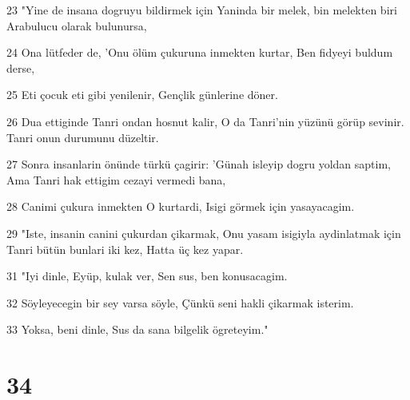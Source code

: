 \par 23 "Yine de insana dogruyu bildirmek için Yaninda bir melek, bin melekten biri Arabulucu olarak bulunursa,
\par 24 Ona lütfeder de, 'Onu ölüm çukuruna inmekten kurtar, Ben fidyeyi buldum derse,
\par 25 Eti çocuk eti gibi yenilenir, Gençlik günlerine döner.
\par 26 Dua ettiginde Tanri ondan hosnut kalir, O da Tanri'nin yüzünü görüp sevinir. Tanri onun durumunu düzeltir.
\par 27 Sonra insanlarin önünde türkü çagirir: 'Günah isleyip dogru yoldan saptim, Ama Tanri hak ettigim cezayi vermedi bana,
\par 28 Canimi çukura inmekten O kurtardi, Isigi görmek için yasayacagim.
\par 29 "Iste, insanin canini çukurdan çikarmak, Onu yasam isigiyla aydinlatmak için Tanri bütün bunlari iki kez, Hatta üç kez yapar.
\par 31 "Iyi dinle, Eyüp, kulak ver, Sen sus, ben konusacagim.
\par 32 Söyleyecegin bir sey varsa söyle, Çünkü seni hakli çikarmak isterim.
\par 33 Yoksa, beni dinle, Sus da sana bilgelik ögreteyim."

\chapter{34}

